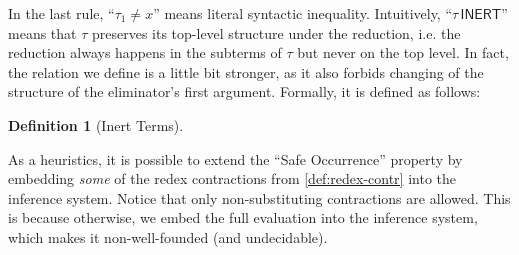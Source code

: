 \documentclass[a4,natbib=false]{article}
\newtheorem{definition}{Definition}
\newcommand{\narg}[1]{|{#1}|}
\newcommand{\judgeSinert}[1]{{#1}\,\mathsf{INERT}}
\newcommand{\fullterm}[2]{{#1}\,#2_1 \dots #2_{\narg{#1}}}
\newcommand{\Infer}[3]{\inferrule*[right={#1}]{#2}{#3}}
\begin{document}
In the last rule, ``$\tau_1 \neq x$'' means literal syntactic inequality.
Intuitively, ``$\judgeSinert{\tau}$'' means that $\tau$ preserves its
top-level structure under the reduction, i.e. the reduction always happens in
the subterms of $\tau$ but never on the top level. In fact, the relation we
define is a little bit stronger, as it also forbids changing of the structure 
of the eliminator's first argument. Formally, it is defined as follows:

\begin{definition}[Inert Terms]
\end{definition}

As a heuristics, it is possible to extend the ``Safe Occurrence'' property by
embedding \emph{some} of the redex contractions from \cref{def:redex-contr} into the
inference system. Notice that only non-substituting contractions are allowed.
This is because otherwise, we embed the full evaluation into the inference
system, which makes it non-well-founded (and undecidable).
\end{document}
